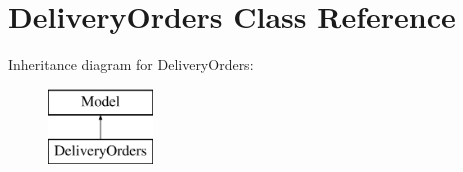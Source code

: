 \hypertarget{classapp_1_1models_1_1_delivery_orders}{}\section{Delivery\+Orders Class Reference}
\label{classapp_1_1models_1_1_delivery_orders}
Inheritance diagram for Delivery\+Orders\+:\begin{figure}[H]
\begin{center}
\leavevmode
\includegraphics[height=2.000000cm]{classapp_1_1models_1_1_delivery_orders}
\end{center}
\end{figure}
